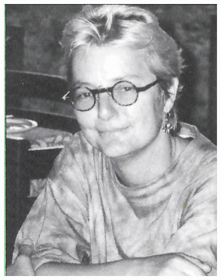 \documentclass[]{book}
\begin{document}
\begin{figure}[htp]
{        \includegraphics[height=\theight\textheight,keepaspectratio]{./Dirigenten/Dirigentin-Beatrice-Renkewitz.jpg}%
    }\hfil
\end{figure}
\end{document}
